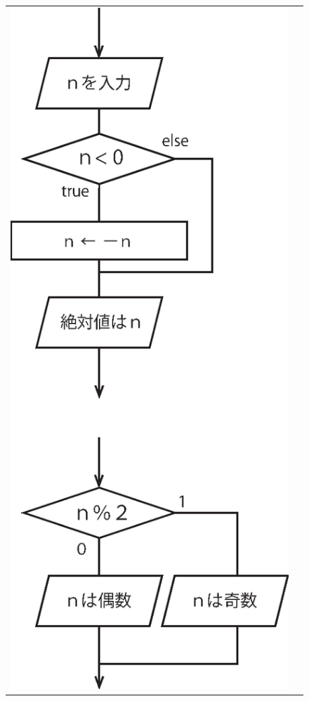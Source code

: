 \documentclass[uplatex,a4paper,11pt,oneside,openany]{jsbook}
\begin{document}
\begin{figure}[H]
  \centering
  \begin{tabular}{ll}
      \begin{minipage}{0.65\hsize}
      \centering

      \end{minipage}
      \begin{minipage}{0.35\hsize}
      \flushright
\includegraphics[scale=0.5]{figures/eps/odd-even.eps}
      \end{minipage}
    \end{tabular}
\end{figure}%
\end{document}
